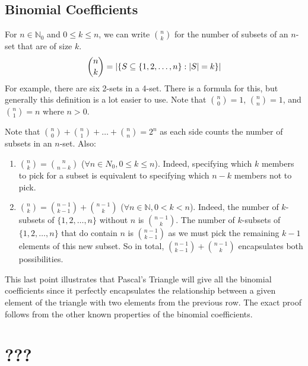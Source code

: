 \documentclass{article}
\begin{document}
	\subsection{Binomial Coefficients}
	For $n \in \mathbb N_0$ and $0 \leq k \leq n$, we can write $\binom{n}{k}$ for the number of subsets of an $n$-set that are of size $k$.
	\[ \binom{n}{k} = \abs{\left\{ S \subseteq \{ 1, 2, \dots, n \}: \abs{S} = k \right\}} \]
	For example, there are six 2-sets in a 4-set. There is a formula for this, but generally this definition is a lot easier to use. Note that $\binom{n}{0} = 1$, $\binom{n}{n} = 1$, and $\binom{n}{1}=n$ where $n>0$.

	Note that $\binom{n}{0} + \binom{n}{1} + \dots + \binom{n}{n} = 2^n$ as each side counts the number of subsets in an $n$-set. Also:
	\begin{enumerate}
		\item $\binom{n}{k} = \binom{n}{n-k}$ ($\forall n \in N_0, 0 \leq k \leq n$). Indeed, specifying which $k$ members to pick for a subset is equivalent to specifying which $n-k$ members not to pick.
		\item $\binom{n}{k} = \binom{n-1}{k-1} + \binom{n-1}{k}$ ($\forall n \in \mathbb N, 0 < k < n$). Indeed, the number of $k$-subsets of $\{ 1, 2, \dots, n \}$ without $n$ is $\binom{n-1}{k}$. The number of $k$-subsets of $\{ 1, 2, \dots, n \}$ that do contain $n$ is $\binom{n-1}{k-1}$ as we must pick the remaining $k-1$ elements of this new subset. So in total, $\binom{n-1}{k-1} + \binom{n-1}{k}$ encapsulates both possibilities.
	\end{enumerate}
	This last point illustrates that Pascal's Triangle will give all the binomial coefficients since it perfectly encapsulates the relationship between a given element of the triangle with two elements from the previous row. The exact proof follows from the other known properties of the binomial coefficients.

	\section{???}
\end{document}
